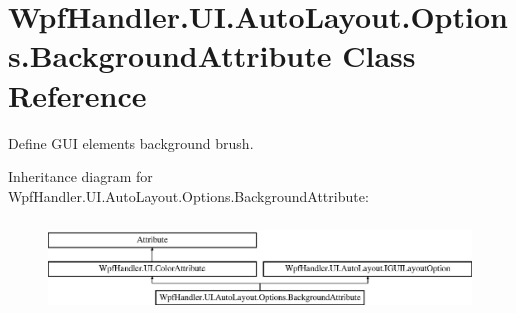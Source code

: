 \hypertarget{class_wpf_handler_1_1_u_i_1_1_auto_layout_1_1_options_1_1_background_attribute}{}\section{Wpf\+Handler.\+U\+I.\+Auto\+Layout.\+Options.\+Background\+Attribute Class Reference}
\label{class_wpf_handler_1_1_u_i_1_1_auto_layout_1_1_options_1_1_background_attribute}


Define G\+UI element\textquotesingle{}s background brush.  


Inheritance diagram for Wpf\+Handler.\+U\+I.\+Auto\+Layout.\+Options.\+Background\+Attribute\+:\begin{figure}[H]
\begin{center}
\leavevmode
\includegraphics[height=2.500000cm]{d7/dde/class_wpf_handler_1_1_u_i_1_1_auto_layout_1_1_options_1_1_background_attribute}
\end{center}
\end{figure}
